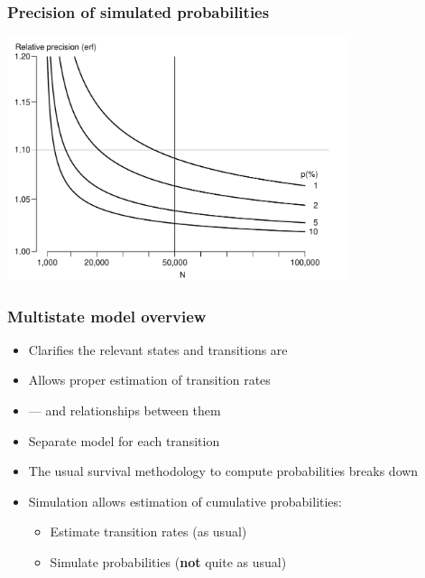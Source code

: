 \begin{frame}
   \frametitle{Precision of simulated probabilities}
\includegraphics[width=0.75\textwidth]{./se-probs.pdf}
\end{frame}

\begin{frame}
   \frametitle{Multistate model overview}
\pause
   \begin{itemize}[<+->]
   \item Clarifies the relevant states and transitions are
   \item Allows proper estimation of transition rates
   \item --- and relationships between them
   \item Separate model for each transition
   \item The usual survival methodology to compute probabilities breaks down
   \item Simulation allows estimation of cumulative probabilities:

     \begin{itemize}[<+->]
     \item Estimate transition rates (as usual)
     \item Simulate probabilities (\textbf{not} quite as usual)
     \end{itemize}

   \end{itemize}
\end{frame}


